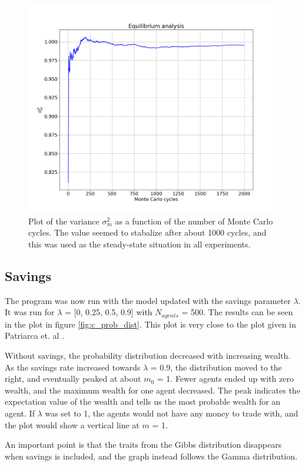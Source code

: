 \documentclass[11pt,a4paper,titlepage]{article}
\begin{document}
\begin{figure}[h!]
\centering
\includegraphics[scale=0.33]{task_b_equi.png}
\caption{Plot of the variance $\sigma^2_m$ as a function of the number of Monte Carlo cycles. The value seemed to stabalize after about 1000 cycles, and this was used as the steady-state situation in all experiments.  \label{fig:b_equi}}
\end{figure}

\subsection{Savings}
The program was now run with the model updated with the savings parameter $\lambda$. It was run for $\lambda$ = [0, 0.25, 0.5, 0.9] with $N_{agents}$ = 500. The results can be seen in the plot in figure \ref{fig:c_prob_dist}. This plot is very close to the plot given in Patriarca et. al \cite{Patriarca}. 

Without savings, the probability distribution decreased with increasing wealth. As the savings rate increased towards $\lambda$ = 0.9, the distribution moved to the right, and eventually peaked at about $m_0$ = 1. Fewer agents ended up with zero wealth, and the maximum wealth for one agent decreased. The peak indicates the expectation value of the wealth and tells us the most probable wealth for an agent. If $\lambda$ was set to 1, the agents would not have any money to trade with, and the plot would show a vertical line at $m$ = 1. 
 
An important point is that the traits from the Gibbs distribution disappears when savings is included, and the graph instead follows the Gamma distribution.
\end{document}
